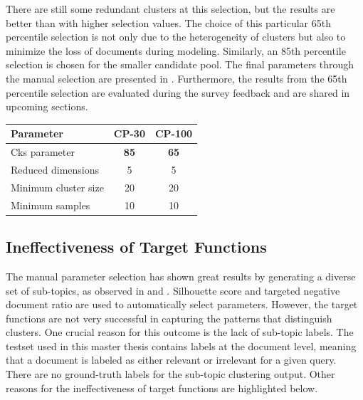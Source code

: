 There are still some redundant clusters at this selection, but the results are better than with higher selection values. The choice of this particular 65th percentile selection is not only due to the heterogeneity of clusters but also to minimize the loss of documents during modeling. Similarly, an 85th percentile selection is chosen for the smaller candidate pool. The final parameters through the manual selection are presented in . Furthermore, the results from the 65th percentile selection are evaluated during the survey feedback and are shared in upcoming sections.
\\
 
 \begin{center}
 	\label{tab:manual_parameter_selection}
 	\begin{tabularx}{.5\textwidth}{|Y|c|c|}
 		\hline
 		Parameter & CP-30 & CP-100 \\
 		\hline
 		
 		Cks parameter & \textbf{85} &         \textbf{65} \\ \hline
 		Reduced dimensions &  5  &       5 \\ \hline
 		Minimum cluster size & 20 &         20 \\ \hline
 		Minimum samples &    10  &     10 \\ \hline
 		
 	\end{tabularx}
 	
 \end{center}
 
 \subsection{Ineffectiveness of Target Functions}
 
The manual parameter selection has shown great results by generating a diverse set of sub-topics, as observed in  and . Silhouette score and targeted negative document ratio are used to automatically select parameters. However, the target functions are not very successful in capturing the patterns that distinguish clusters. One crucial reason for this outcome is the lack of sub-topic labels. The testset used in this master thesis contains labels at the document level, meaning that a document is labeled as either relevant or irrelevant for a given query. There are no ground-truth labels for the sub-topic clustering output. Other reasons for the ineffectiveness of target functions are highlighted below.
 
